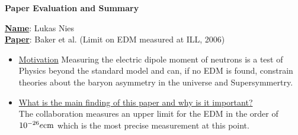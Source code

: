 \documentclass[12pt]{article}
\begin{document}
\noindent
\begin{center}
	\centering
	\Large{\textbf{Paper Evaluation and Summary}}
\end{center}
\textbf{\underline{Name}}: Lukas Nies \\
\noindent
\textbf{\underline{Paper}}: Baker et al. (Limit on EDM measured at ILL, 2006) \\[0.5cm] 
\noindent
\begin{itemize}
	\item \ul{Motivation}
	\noindent
	Measuring the electric dipole moment of neutrons is a test of Physics beyond the standard model and can, if no EDM is found, constrain theories about the baryon asymmetry in the universe and Supersymmertry.
	\item \ul{What is the main finding of this paper and why is it important?} \\
	\noindent
	The collaboration measures an upper limit for the EDM in the order of $\si{10\tothe{-26}\elementarycharge\centi\meter}$ which is the most precise measurement at this point.


\end{itemize}
\end{document}
